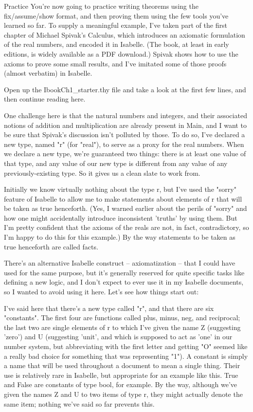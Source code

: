 Practice
You're now going to practice writing theorems using the fix/assume/show format, and then proving them using the few tools you've learned so far. To supply a meaningful example, I've taken part of the first chapter of Michael Spivak's Calculus, which introduces an axiomatic formulation of the real numbers, and encoded it in Isabelle. (The book, at least in early editions, is widely available as a PDF download.) Spivak shows how to use the axioms to prove some small results, and I've imitated some of those proofs (almost verbatim) in Isabelle.

Open up the IbookCh1_starter.thy file and take a look at the first few lines, and then continue reading here.

One challenge here is that the natural numbers and integers, and their associated notions of addition and multiplication are already present in Main, and I want to be sure that Spivak's discussion isn't polluted by those. To do so, I've declared a new type, named "r" (for "real"), to serve as a proxy for the real numbers. When we declare a new type, we're guaranteed two things: there is at least one value of that type, and any value of our new type is different from any value of any previously-existing type. So it gives us a clean slate to work from. 

Initially we know virtually nothing about the type r, but I've used the "sorry" feature of Isabelle to allow me to make statements about elements of r that will be taken as true henceforth. (Yes, I warned earlier about the perils of "sorry" and how one might accidentally introduce inconsistent 'truths' by using them. But I'm pretty confident that the axioms of the reals are not, in fact, contradictory, so I'm happy to do this for this example.) By the way statements to be taken as true henceforth are called facts. 

There's an alternative Isabelle construct -- axiomatization -- that I could have used for the same purpose, but it's generally reserved for quite specific tasks like defining a new logic, and I don't expect to ever use it in my Isabelle documents, so I wanted to avoid using it here. Let's see how things start out:

I've said here that there's a new type called "r", and that there are six "constants". The first four are functions called plus, minus, neg, and reciprocal; the last two are single elements of r to which I've given the name Z (suggesting 'zero') and U (suggesting 'unit', and which is supposed to act as 'one'  in our number system, but abbreviating with the first letter and getting "O" seemed like a really bad choice for something that was representing "1"). A constant is simply a name that will be used throughout a document to mean a single thing. Their use is relatively rare in Isabelle, but appropriate for an example like this. True and False are constants of type bool, for example. By the way, although we've given the names Z and U to two items of type r, they might actually denote the same item; nothing we've said so far prevents this.

